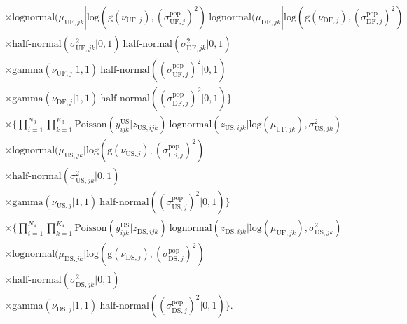 \documentclass[12pt, oneside, titlepage]{article}   	%
\begin{document}
\begin{align}
\begin{split}
	     & \times \mathrm{lognormal} ( \mu_{\mathrm{UF},jk} | \mathrm{log}(\mathrm{g}(\nu_{\mathrm{UF},j}), (\sigma^\mathrm{pop}_{\mathrm{UF},j} )^2 )\  \mathrm{lognormal} ( \mu_{\mathrm{DF},jk} | \mathrm{log}(\mathrm{g}(\nu_{\mathrm{DF},j}), (\sigma^\mathrm{pop}_{\mathrm{DF},j} )^2 )   \\
	     & \times \textrm{half-normal}  ( \sigma^2_{\mathrm{UF},jk}  | 0, 1 )\ \textrm{half-normal}  ( \sigma^2_{\mathrm{DF},jk}  | 0, 1 ) \\
	     & \times \mathrm{gamma} (\nu_{\mathrm{UF},j} | 1 , 1)\  \textrm{half-normal} ( (\sigma^\mathrm{pop}_{\mathrm{UF},j} )^2  | 0, 1 ) \\
	     & \times  \mathrm{gamma} (\nu_{\mathrm{DF},j} | 1 , 1)\  \textrm{half-normal} ( (\sigma^\mathrm{pop}_{\mathrm{DF},j} )^2  | 0, 1 ) \Big\}  \\
	      & \times \Big\{  \prod_{i=1}^{N_3}  \prod_{k=1}^{K_3}  \mathrm{Poisson} ( y^\mathrm{US}_{ijk} | z_{\mathrm{US},ijk} )\ \mathrm{lognormal} ( z_{\mathrm{US},ijk} | \mathrm{log}(\mu_{\mathrm{UF},jk}), \sigma^2_{\mathrm{US},jk} )  \\
	     & \times \mathrm{lognormal} ( \mu_{\mathrm{US},jk} | \mathrm{log}(\mathrm{g}(\nu_{\mathrm{US},j}), (\sigma^\mathrm{pop}_{\mathrm{US},j} )^2 )  \\
	     & \times \textrm{half-normal} ( \sigma^2_{\mathrm{US},jk}  | 0, 1 ) \\
	     & \times \mathrm{gamma} (\nu_{\mathrm{US},j} | 1 , 1)\  \textrm{half-normal} ( (\sigma^\mathrm{pop}_{\mathrm{US},j} )^2  | 0, 1 ) \Big\}   \\
	     & \times \Big\{  \prod_{i=1}^{N_4}  \prod_{k=1}^{K_4}  \mathrm{Poisson} ( y^\mathrm{DS}_{ijk} | z_{\mathrm{DS},ijk} )\ \mathrm{lognormal} ( z_{\mathrm{DS},ijk} | \mathrm{log}(\mu_{\mathrm{UF},jk}), \sigma^2_{\mathrm{DS},jk} )  \\
	     & \times \mathrm{lognormal} ( \mu_{\mathrm{DS},jk} | \mathrm{log}(\mathrm{g}(\nu_{\mathrm{DS},j}), (\sigma^\mathrm{pop}_{\mathrm{DS},j} )^2 )  \\
	     & \times \textrm{half-normal}  ( \sigma^2_{\mathrm{DS},jk}  | 0, 1 ) \\
	     & \times \mathrm{gamma} (\nu_{\mathrm{DS},j} | 1 , 1)\  \textrm{half-normal} ( (\sigma^\mathrm{pop}_{\mathrm{DS},j} )^2  | 0,1) \Big\}.
  \end{split}
\end{align}
\end{document}
